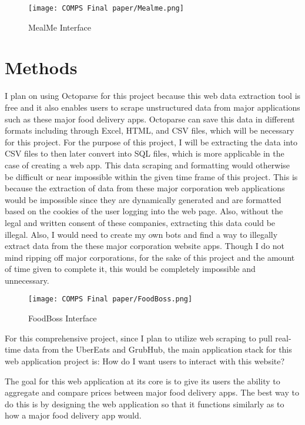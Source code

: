 \documentclass[10pt,twocolumn]{article}
\begin{document}
\begin{figure}
    \centering
    \texttt{[image: COMPS Final paper/Mealme.png]}
    \caption{
        MealMe Interface
    }
    \label{fig:second-page-2}
\end{figure}

\section{Methods}

I plan on using Octoparse for this project because this web data extraction tool is free and it also enables users to scrape unstructured data from major applications such as these major food delivery apps. Octoparse can save this data in different formats including through Excel, HTML, and CSV files, which will be necessary for this project. For the purpose of this project, I will be extracting the data into CSV files to then later convert into SQL files, which is more applicable in the case of creating a web app. This data scraping and formatting would otherwise be difficult or near impossible within the given time frame of this project. This is because the extraction of data from these major corporation web applications would be impossible since they are dynamically generated and are formatted based on the cookies of the user logging into the web page. Also, without the legal and written consent of these companies, extracting this data could be illegal. Also, I would need to create my own bots and find a way to illegally extract data from the these major corporation website apps. Though I do not mind ripping off major corporations, for the sake of this project and the amount of time given to complete it, this would be completely impossible and unnecessary.

\begin{figure}
    \centering
    \texttt{[image: COMPS Final paper/FoodBoss.png]}
    \caption{
        FoodBoss Interface
    }
    \label{fig:second-page-3}
\end{figure}

For this comprehensive project, since I plan to utilize web scraping to pull real-time data from the UberEats and GrubHub, the main application stack for this web application project is: How do I want users to interact with this website? 

The goal for this web application at its core is to give its users the ability to aggregate and compare prices between major food delivery apps. The best way to do this is by designing the web application so that it functions similarly as to how a major food delivery app would.
\end{document}
